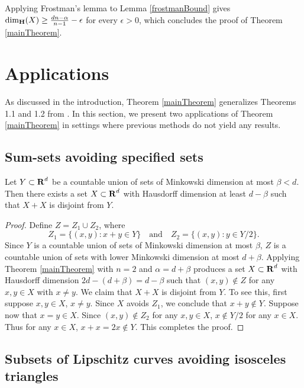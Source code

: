 Applying Frostman's lemma to Lemma \ref{frostmanBound} gives $\operatorname{\dim_{\mathbf{H}}}(X) \geq \frac{dn - \alpha}{n - 1} - \epsilon$ for every $\epsilon>0$, which concludes the proof of Theorem \ref{mainTheorem}.









\section{Applications}\label{applications}

As discussed in the introduction, Theorem \ref{mainTheorem} generalizes Theorems 1.1 and 1.2 from \cite{MalabikaRob}. In this section, we present two applications of Theorem \ref{mainTheorem} in settings where previous methods do not yield any results.

\subsection{Sum-sets avoiding specified sets}

\begin{theorem} \label{sumset-application} 
	Let $Y \subset \operatorname{\mathbf{R}}^d$ be a countable union of sets of Minkowski dimension at most $\beta < d$. Then there exists a set $X \subset \operatorname{\mathbf{R}}^d$ with Hausdorff dimension at least $d - \beta$ such that $X + X$ is disjoint from $Y$.
\end{theorem}
\begin{proof}
	Define $Z = Z_1 \cup Z_2$, where
	\[ Z_1 = \{ (x,y) : x + y \in Y \} \quad \text{and} \quad Z_2 = \{ (x,y) : y \in Y/2 \}. \]
	Since $Y$ is a countable union of sets of Minkowski dimension at most $\beta$, $Z$ is a countable union of sets with lower Minkowski dimension at most $d + \beta$. Applying Theorem \ref{mainTheorem} with $n = 2$ and $\alpha = d + \beta$ produces a set $X \subset \operatorname{\mathbf{R}}^d$ with Hausdorff dimension $2d  - (d + \beta) = d - \beta$ such that $(x,y) \not \in Z$ for any $x,y \in X$ with $x \neq y$. We claim that $X+ X$ is disjoint from $Y$. To see this, first suppose $x, y \in X$, $x \ne y$. Since $X$ avoids $Z_1$, we conclude that $x + y \not \in Y$. Suppose now that $x = y \in X$. Since $(x,y) \not \in Z_2$ for any $x,y \in X$, $x \not \in Y/2$ for any $x \in X$. Thus for any $x \in X$, $x + x = 2x \not \in Y$. This completes the proof. 
\end{proof}


\subsection{Subsets of Lipschitz curves avoiding isosceles triangles}

